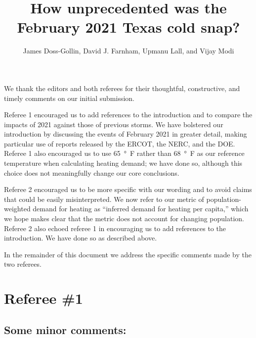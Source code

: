 \documentclass{ar2rc}
\title{How unprecedented was the February 2021 Texas cold snap?}
\author{James Doss-Gollin, David J. Farnham, Upmanu Lall, and Vijay Modi}
\begin{document}
\maketitle

\listoftodos

We thank the editors and both referees for their thoughtful, constructive, and timely comments on our initial submission.

Referee 1 encouraged us to add references to the introduction and to compare the impacts of 2021 against those of previous storms.
We have bolstered our introduction by discussing the events of February 2021 in greater detail, making particular use of reports released by the ERCOT, the NERC, and the DOE.
Referee 1 also encouraged us to use \SI{65}{\degree F} rather than \SI{68}{\degree F} as our reference temperature when calculating heating demand; we have done so, although this choice does not meaningfully change our core conclusions.

Referee 2 encouraged us to be more specific with our wording and to avoid claims that could be easily misinterpreted.
We now refer to our metric of population-weighted demand for heating as ``inferred demand for heating per capita,'' which we hope makes clear that the metric does not account for changing population.
Referee 2 also echoed referee 1 in encouraging us to add references to the introduction.
We have done so as described above.

In the remainder of this document we address the specific comments made by the two referees.

\section{Referee \#1}



\subsection{Some minor comments:}
\end{document}
